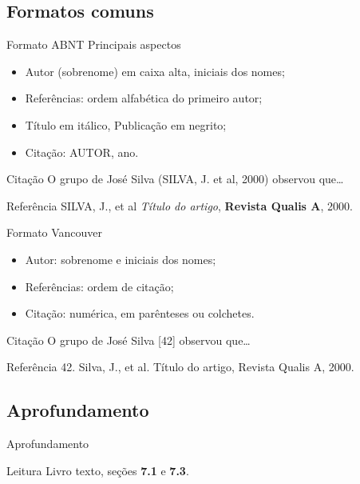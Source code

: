 \documentclass{beamer}
\begin{document}
\subsection{Formatos comuns}

\begin{frame}{Formato ABNT}
  Principais aspectos
  \begin{itemize}
    \footnotesize
  \item Autor (sobrenome) em caixa alta, iniciais dos nomes;
  \item Referências: ordem alfabética do primeiro autor;
  \item Título em itálico, Publicação em negrito;
  \item Citação: AUTOR, ano.
  \end{itemize}
  \bigskip
  \begin{exampleblock}{Citação}
    \footnotesize
    O grupo de José Silva (SILVA, J. et al, 2000) observou que\ldots
  \end{exampleblock}
  \begin{exampleblock}{Referência}
    \footnotesize
    SILVA, J., et al {\em Título do artigo}, {\bf Revista Qualis A},
    2000.
  \end{exampleblock}
\end{frame}

\begin{frame}{Formato Vancouver}
  \begin{itemize}
    \footnotesize
  \item Autor: sobrenome e iniciais dos nomes;
  \item Referências: ordem de citação;
  \item Citação: numérica, em parênteses ou colchetes.
  \end{itemize}
  \bigskip
  \begin{exampleblock}{Citação}
    \footnotesize
    O grupo de José Silva [42] observou que\ldots
  \end{exampleblock}
  \begin{exampleblock}{Referência}
    \footnotesize
    42. Silva, J., et al. Título do artigo, Revista Qualis A, 2000.
  \end{exampleblock}
\end{frame}

\subsection{Aprofundamento}

\begin{frame}{Aprofundamento}
  \begin{block}{Leitura}
    Livro texto, seções {\bf 7.1} e {\bf 7.3}.
  \end{block}
\end{frame}
\end{document}
